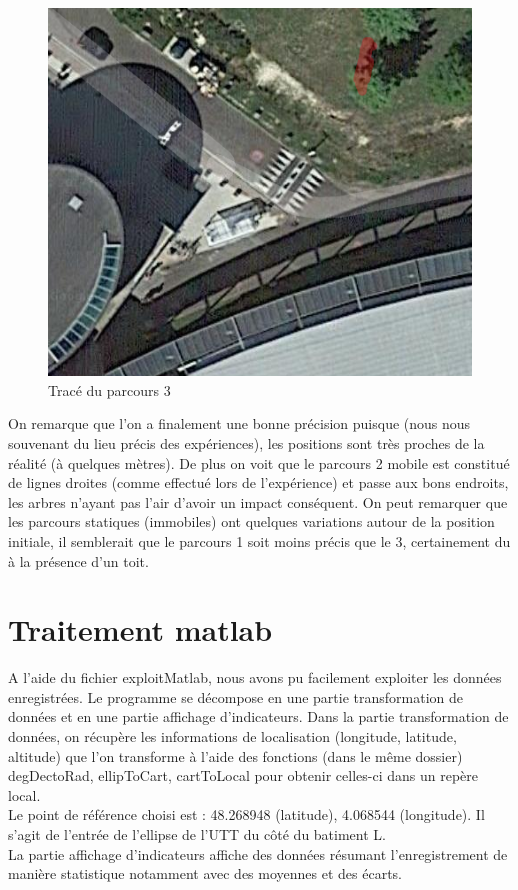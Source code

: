 \documentclass{report}
\begin{document}
\begin{figure}[H]
	\begin{center}
		\includegraphics[scale=0.5]{Enregistrements/parcoursEnrTres1206.png}
	\end{center}
	\caption{Tracé du parcours 3}
\end{figure}

On remarque que l'on a finalement une bonne précision
puisque (nous nous souvenant du lieu précis des 
expériences), les positions sont très proches de la
réalité (à quelques mètres). De plus on voit que le
parcours 2 mobile est constitué de lignes droites (comme
effectué lors de l'expérience) et passe aux bons
endroits, les arbres n'ayant pas l'air d'avoir un impact conséquent.
On peut remarquer que les parcours statiques (immobiles) ont quelques
variations autour de la position initiale, il semblerait que le 
parcours 1 soit moins précis que le 3, certainement du à la présence 
d'un toit.


\section{Traitement matlab}
A l'aide du fichier exploitMatlab, nous avons pu facilement exploiter
les données enregistrées. Le programme se décompose en une partie
transformation de données et en une partie affichage d'indicateurs.
Dans la partie transformation de données, on récupère les informations
de localisation (longitude, latitude, altitude) que l'on transforme 
à l'aide des fonctions (dans le même dossier) degDectoRad, ellipToCart,
cartToLocal pour obtenir celles-ci dans un repère local. \\
Le point de référence choisi est : 48.268948 (latitude), 4.068544 (longitude). 
Il s'agit de l'entrée de l'ellipse de l'UTT du côté du
batiment L. \\
La partie affichage d'indicateurs affiche des données résumant
l'enregistrement de manière statistique notamment avec des moyennes et
des écarts.
\end{document}

